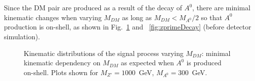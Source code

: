 Since the DM pair are produced as a result of the decay of $A^0$, there are minimal kinematic changes when varying $M_{DM}$ 
as long as $M_{DM}<M_{A^0}/2$ so that $A^0$ production is on-shell, as shown in Fig.~\ref{fig:DMH_mdm} and~
\ref{fig:zprimeDecay} (before detector simulation). 

\begin{figure}[h!]
	\centering
	\hfill
	\caption{Kinematic distributions of the signal process varying $M_{DM}$: minimal kinematic dependency on $M_{DM}$ as expected when $A^0$ is produced on-shell. Plots shown for $M_{Z'}=1000$~GeV, $M_{A^0}=300$~GeV.}
	\label{fig:DMH_mdm}
\end{figure}
 
